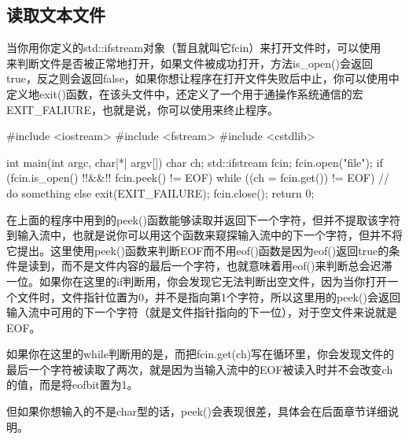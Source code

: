 \subsection{读取文本文件}

当你用你定义的std::ifstream对象（暂且就叫它fcin）来打开文件时，可以使用\\ 来判断文件是否被正常地打开，如果文件被成功打开，方法is\_open()会返回true，反之则会返回false，如果你想让程序在打开文件失败后中止，你可以使用中定义地exit()函数，在该头文件中，还定义了一个用于通操作系统通信的宏EXIT\_FALIURE，也就是说，你可以使用来终止程序。

\begin{cpp}
#include <iostream>
#include <fstream>
#include <cstdlib>

int main(int argc, char|*| argv[]) {
    char ch;
    std::ifstream fcin;
    fcin.open("file");
    if (fcin.is_open() !!&&!! fcin.peek() != EOF) {
        while ((ch = fcin.get()) != EOF) {
            // do something
        }
    }
    else {
        exit(EXIT_FAILURE);
    }
    fcin.close();
    return 0;
}
\end{cpp}

在上面的程序中用到的peek()函数能够读取并返回下一个字符，但并不提取该字符到输入流中，也就是说你可以用这个函数来窥探输入流中的下一个字符，但并不将它提出。这里使用peek()函数来判断EOF而不用eof()函数是因为eof()返回true的条件是读到，而不是文件内容的最后一个字符，也就意味着用eof()来判断总会迟滞一位。如果你在这里的if判断用，你会发现它无法判断出空文件，因为当你打开一个文件时，文件指针位置为0，并不是指向第1个字符，所以这里用的peek()会返回输入流中可用的下一个字符（就是文件指针指向的下一位），对于空文件来说就是EOF。

如果你在这里的while判断用的是，而把fcin.get(ch)写在循环里，你会发现文件的最后一个字符被读取了两次，就是因为当输入流中的EOF被读入时并不会改变ch的值，而是将eof\/bit置为1。

但如果你想输入的不是char型的话，peek()会表现很差，具体会在后面章节详细说明。
